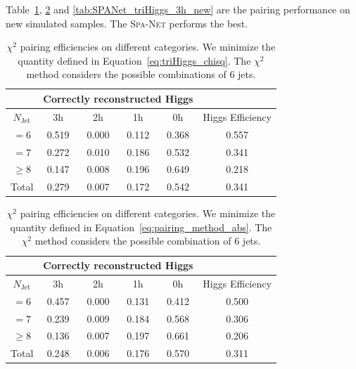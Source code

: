 \documentclass[12pt]{article}
\begin{document}
    Table~\ref{tab:chi2_pairing_triHiggs_3h_new}, \ref{tab:chi2_abs_pairing_triHiggs_3h_new} and \ref{tab:SPANet_triHiggs_3h_new} are the pairing performance on new simulated samples. The \textsc{Spa-Net} performs the best.
    \begin{table}[htpb]
		\centering
        \caption{$\chi^2$ pairing efficiencies on different categories. We minimize the quantity defined in Equation~\ref{eq:triHiggs_chisq}. The $\chi^2$ method considers the possible combinations of 6 jets.}
		\label{tab:chi2_pairing_triHiggs_3h_new}
		\begin{tabular}{c|cccc|c}
			\multicolumn{1}{l|}{} & \multicolumn{4}{c|}{Correctly reconstructed Higgs} & \multicolumn{1}{l}{} \\ \hline
			$N_\text{Jet}$        & 3h          & 2h         & 1h         & 0h         & Higgs Efficiency     \\ \hline
			$=6$                  & 0.519 & 0.000 & 0.112 & 0.368 &  0.557 \\
			$=7$                  & 0.272 & 0.010 & 0.186 & 0.532 &  0.341 \\
			$\ge 8$               & 0.147 & 0.008 & 0.196 & 0.649 &  0.218 \\ \hline
			Total                 & 0.279 & 0.007 & 0.172 & 0.542 &  0.341 
		\end{tabular}
	\end{table}
    \begin{table}[htpb]
		\centering
		\caption{$\chi^2$ pairing efficiencies on different categories. We minimize the quantity defined in Equation~\ref{eq:pairing_method_abs}. The $\chi^2$ method considers the possible combination of 6 jets.}
		\label{tab:chi2_abs_pairing_triHiggs_3h_new}
		\begin{tabular}{c|cccc|c}
			\multicolumn{1}{l|}{} & \multicolumn{4}{c|}{Correctly reconstructed Higgs} & \multicolumn{1}{l}{} \\ \hline
			$N_\text{Jet}$        & 3h          & 2h         & 1h         & 0h         & Higgs Efficiency     \\ \hline
			$=6$                  & 0.457 & 0.000 & 0.131 & 0.412 &  0.500                \\
			$=7$                  & 0.239 & 0.009 & 0.184 & 0.568 &  0.306                \\
			$\ge 8$               & 0.136 & 0.007 & 0.197 & 0.661 &  0.206                \\ \hline
			Total                 & 0.248 & 0.006 & 0.176 & 0.570 &  0.311               
		\end{tabular}
	\end{table}
\end{document}
